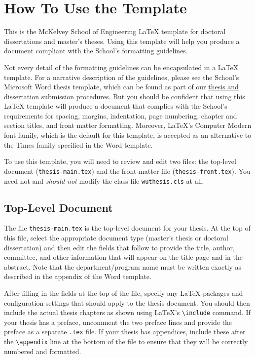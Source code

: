 \chapter{How To Use the Template}
\label{cpt1}

This is the McKelvey School of Engineering LaTeX template for doctoral dissertations and master's theses. Using this template will help you produce a document compliant with the School's formatting guidelines.

Not every detail of the formatting guidelines can be encapsulated in a LaTeX template. For a narrative description of the guidelines, please see the School's Microsoft Word thesis template, which can be found as part of our \href{https://engineering.wustl.edu/offices-services/student-services/graduate-student-services/thesis-dissertation-submission.html}{thesis and dissertation submission procedures}. But you should be confident that using this LaTeX template will produce a document that complies with the School's requirements for spacing, margins, indentation, page numbering, chapter and section titles, and front matter formatting. Moreover, LaTeX's Computer Modern font family, which is the default for this template, is accepted as an alternative to the Times family specified in the Word template.

To use this template, you will need to review and edit two files: the top-level document (\texttt{thesis-main.tex}) and the front-matter file (\texttt{thesis-front.tex}).  You need not and \emph{should not} modify the class file \texttt{wuthesis.cls} at all.

\section{Top-Level Document}

The file \texttt{thesis-main.tex} is the top-level document for your thesis. At the top of this file, select the appropriate document type (master's thesis or doctoral dissertation) and then edit the fields that follow to provide the title, author, committee, and other information that will appear on the title page and in the abstract.  Note that the department/program name must be written exactly as described in the appendix of the Word template.

After filling in the fields at the top of the file, specify any LaTeX packages and configuration settings that should apply to the thesis document. You should then include the actual thesis chapters as shown using LaTeX's \texttt{\textbackslash include} command.  If your thesis has a preface, uncomment the two preface lines and provide the preface as a separate \texttt{.tex} file. If your thesis has appendices, include these after the \texttt{\textbackslash appendix} line at the bottom of the file to ensure that they will be correctly numbered and formatted.

